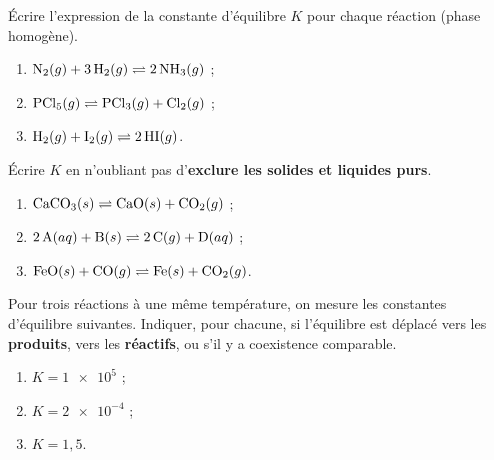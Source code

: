 \documentclass[11pt,a4paper]{article}
\begin{document}
\begin{center}
\end{center}

\begin{exercice}
Écrire l'expression de la constante d'équilibre $K$ pour chaque réaction (phase homogène).
\begin{enumerate}[label=\alph*),leftmargin=2em,topsep=2pt,itemsep=2pt]
  \item $\ce{N2}(g) + 3\,\ce{H2}(g) \rightleftharpoons 2\,\ce{NH3}(g)$ ;
  \item $\ce{PCl5}(g) \rightleftharpoons \ce{PCl3}(g) + \ce{Cl2}(g)$ ;
  \item $\ce{H2}(g) + \ce{I2}(g) \rightleftharpoons 2\,\ce{HI}(g)$.
\end{enumerate}
\end{exercice}

\begin{exercice}
Écrire $K$ en n'oubliant pas d'\textbf{exclure les solides et liquides purs}.
\begin{enumerate}[label=\alph*),leftmargin=2em,topsep=2pt,itemsep=2pt]
  \item $\ce{CaCO3}(s) \rightleftharpoons \ce{CaO}(s) + \ce{CO2}(g)$ ;
  \item $2\,\ce{A}(aq) + \ce{B}(s) \rightleftharpoons 2\,\ce{C}(g) + \ce{D}(aq)$ ;
  \item $\ce{FeO}(s) + \ce{CO}(g) \rightleftharpoons \ce{Fe}(s) + \ce{CO2}(g)$.
\end{enumerate}
\end{exercice}

\begin{exercice}
Pour trois réactions à une même température, on mesure les constantes d'équilibre suivantes. Indiquer, pour
chacune, si l'équilibre est déplacé vers les \textbf{produits}, vers les \textbf{réactifs}, ou s'il y a
coexistence comparable.
\begin{enumerate}[label=\alph*),leftmargin=2em,topsep=2pt,itemsep=2pt]
  \item $K = \num{1e5}$ ;
  \item $K = \num{2e-4}$ ;
  \item $K = 1{,}5$.
\end{enumerate}
\end{exercice}
\end{document}
